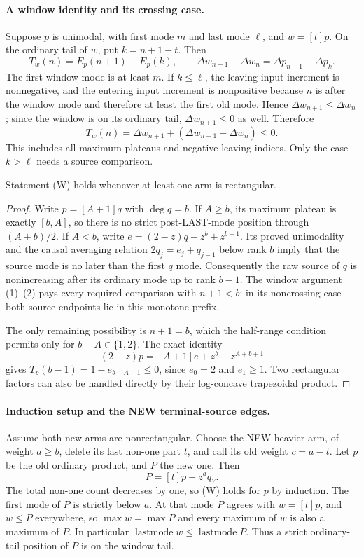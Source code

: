 \paragraph{A window identity and its crossing case.}
Suppose $p$ is unimodal, with first mode $m$ and last mode $\ell$,
and $w=[t]p$. On the ordinary tail of $w$, put $k=n+1-t$.
Then
\[
 T_w(n)=E_p(n+1)-E_p(k),\qquad
 \Delta w_{n+1}-\Delta w_n=\Delta p_{n+1}-\Delta p_k.   \tag{1}
\]
The first window mode is at least $m$. If $k\le\ell$, the leaving
input increment is nonnegative, and the entering input increment is
nonpositive because $n$ is after the window mode and therefore at least
the first old mode. Hence $\Delta w_{n+1}\le\Delta w_n$; since the window
is on its ordinary tail, $\Delta w_{n+1}\le0$ as well. Therefore
\[
 T_w(n)=\Delta w_{n+1}+(\Delta w_{n+1}-\Delta w_n)\le0. \tag{2}
\]
This includes all maximum plateaus and negative leaving indices.
Only the case $k>\ell$ needs a source comparison.

\begin{lemma}
Statement (W) holds whenever at least one arm is rectangular.
\end{lemma}
\begin{proof}
Write $p=[A+1]q$ with $\deg q=b$.
If $A\ge b$, its maximum plateau is exactly $[b,A]$, so there is no
strict post-LAST-mode position through $(A+b)/2$.
If $A<b$, write $e=(2-z)q-z^b+z^{b+1}$. Its proved unimodality and
the causal averaging relation $2q_j=e_j+q_{j-1}$ below rank $b$ imply
that the source mode is no later than the first $q$ mode. Consequently
the raw source of $q$ is nonincreasing after its ordinary mode up to
rank $b-1$. The window argument (1)--(2) pays every required comparison
with $n+1<b$: in its noncrossing case both source endpoints lie in
this monotone prefix.

The only remaining possibility is $n+1=b$, which the half-range
condition permits only for $b-A\in\{1,2\}$. The exact identity
\[
                  (2-z)p=[A+1]e+z^b-z^{A+b+1}
\]
gives
$T_p(b-1)=1-e_{b-A-1}\le0$, since $e_0=2$ and $e_1\ge1$.
Two rectangular factors can also be handled directly by their
log-concave trapezoidal product.
\end{proof}

\paragraph{Induction setup and the NEW terminal-source edges.}
Assume both new arms are nonrectangular. Choose the NEW heavier arm,
of weight $a\ge b$, delete its last non-one part $t$, and call its
old weight $c=a-t$. Let $p$ be the old ordinary product, and $P$ the
new one. Then
\[
                          P=[t]p+z^a q_Y.              \tag{3}
\]
The total non-one count decreases by one, so (W) holds for $p$ by
induction. The first mode of $P$ is strictly below $a$.
At that mode $P$ agrees with $w=[t]p$, and $w\le P$ everywhere,
so $\max w=\max P$ and every maximum of $w$ is also a maximum of $P$.
In particular
$\operatorname{lastmode}w\le\operatorname{lastmode}P$.
Thus a strict ordinary-tail position of $P$ is on the window tail.

